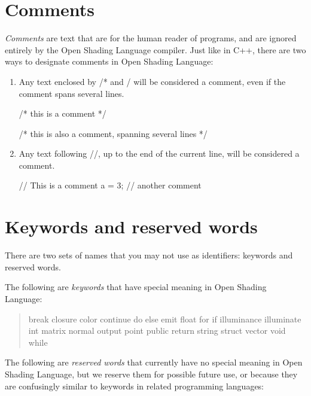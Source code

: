\documentclass[11pt,letterpaper]{book}
\def\langname{Open Shading Language\xspace}
\begin{document}
\section{Comments}
\label{sec:comments}

\emph{Comments} are text that are for the human reader of programs, and
are ignored entirely by the \langname compiler.  Just like in C++, there
are two ways to designate comments in \langname:

\begin{enumerate}
\item Any text enclosed by {\cf /*} and {\cf */} will be considered
a comment, even if the comment spans several lines.

\begin{code}
    /* this is a comment */

    /* this is also
       a comment, spanning
       several lines */
\end{code}

\item Any text following {\cf //}, up to the end of the current line,
will be considered a comment.

\begin{code}
    // This is a comment
    a = 3;   // another comment
\end{code}
\end{enumerate}


\section{Keywords and reserved words}
\label{sec:lexical:keyreserved}

There are two sets of names that you may not use as identifiers:
keywords and reserved words.

The following are \emph{keywords} that have special meaning in
\langname: 

\begin{quote} {\cf

break closure color continue do else emit float for if illuminance
illuminate int matrix normal output point public return string struct
vector void while

}
\end{quote}

The following are \emph{reserved words} that currently have no special
meaning in \langname, but we reserve them for possible future use, or
because they are confusingly similar to keywords in related programming
languages: 
\end{document}
